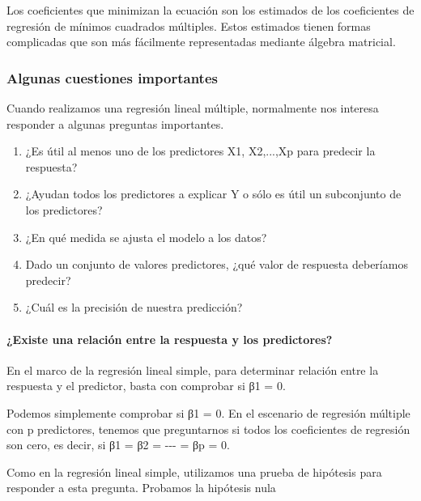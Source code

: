 \documentclass[
  letterpaper,
  DIV=11,
  numbers=noendperiod]{scrartcl}
\let\oldparagraph\paragraph
\renewcommand{\paragraph}[1]{\oldparagraph{#1}\mbox{}}
\begin{document}
Los coeficientes que minimizan la ecuación son los estimados de los
coeficientes de regresión de mínimos cuadrados múltiples. Estos
estimados tienen formas complicadas que son más fácilmente representadas
mediante álgebra matricial.

\hypertarget{algunas-cuestiones-importantes}{%
\subsubsection{\texorpdfstring{\textbf{Algunas cuestiones
importantes}}{Algunas cuestiones importantes}}\label{algunas-cuestiones-importantes}}

Cuando realizamos una regresión lineal múltiple, normalmente nos
interesa responder a algunas preguntas importantes.

\begin{enumerate}
\def\labelenumi{\arabic{enumi}.}
\item
  ¿Es útil al menos uno de los predictores X1, X2,...,Xp para predecir
  la respuesta?
\item
  ¿Ayudan todos los predictores a explicar Y o sólo es útil un
  subconjunto de los predictores?
\item
  ¿En qué medida se ajusta el modelo a los datos?
\item
  Dado un conjunto de valores predictores, ¿qué valor de respuesta
  deberíamos predecir?
\item
  ¿Cuál es la precisión de nuestra predicción?
\end{enumerate}

\hypertarget{existe-una-relaciuxf3n-entre-la-respuesta-y-los-predictores}{%
\paragraph{\texorpdfstring{\textbf{¿Existe una relación entre la
respuesta y los
predictores?}}{¿Existe una relación entre la respuesta y los predictores?}}\label{existe-una-relaciuxf3n-entre-la-respuesta-y-los-predictores}}

En el marco de la regresión lineal simple, para determinar relación
entre la respuesta y el predictor, basta con comprobar si β1 = 0.

Podemos simplemente comprobar si β1 = 0. En el escenario de regresión
múltiple con p predictores, tenemos que preguntarnos si todos los
coeficientes de regresión son cero, es decir, si β1 = β2 = -\/-\/- = βp
= 0.

Como en la regresión lineal simple, utilizamos una prueba de hipótesis
para responder a esta pregunta. Probamos la hipótesis nula
\end{document}
